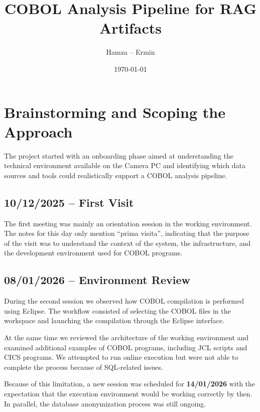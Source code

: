 \documentclass[11pt]{article}
\title{COBOL Analysis Pipeline for RAG Artifacts}
\author{Hamza -- Ermin}
\date{\today}
\begin{document}
\maketitle

\tableofcontents
\newpage




\section{Brainstorming and Scoping the Approach}
\label{sec:brainstorm}

The project started with an onboarding phase aimed at understanding the technical environment available on the Camera PC and identifying which data sources and tools could realistically support a COBOL analysis pipeline.

\subsection*{10/12/2025 -- First Visit}

The first meeting was mainly an orientation session in the working environment. The notes for this day only mention ``prima visita'', indicating that the purpose of the visit was to understand the context of the system, the infrastructure, and the development environment used for COBOL programs.

\subsection*{08/01/2026 -- Environment Review}

During the second session we observed how COBOL compilation is performed using Eclipse. The workflow consisted of selecting the COBOL files in the workspace and launching the compilation through the Eclipse interface.

At the same time we reviewed the architecture of the working environment and examined additional examples of COBOL programs, including JCL scripts and CICS programs. We attempted to run online execution but were not able to complete the process because of SQL-related issues.

Because of this limitation, a new session was scheduled for \textbf{14/01/2026} with the expectation that the execution environment would be working correctly by then. In parallel, the database anonymization process was still ongoing.
\end{document}
